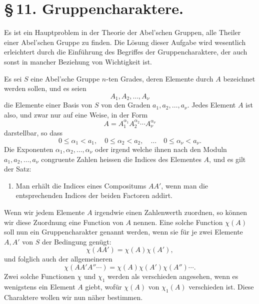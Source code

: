 \documentclass[11pt]{article}
\begin{document}
\section*{\S\,11. Gruppencharaktere.}

Es ist ein Hauptproblem in der Theorie der Abel'schen Gruppen, alle Theiler einer Abel'schen Gruppe zu finden. Die Lösung dieser Aufgabe wird wesentlich erleichtert durch die Einführung des Begriffes der Gruppencharaktere, der auch sonst in mancher Beziehung von Wichtigkeit ist.

Es sei $S$ eine Abel'sche Gruppe $n$-ten Grades, deren Elemente durch $A$ bezeichnet werden sollen, und es seien
\begin{equation}
A_1,A_2,\ldots,A_\nu
\tag{1}
\end{equation}
die Elemente einer Basis von $S$ von den Graden $a_1,a_2,\ldots,a_\nu$. Jedes Element $A$ ist also, und zwar nur auf eine Weise, in der Form
\begin{equation}
A=A_1^{\alpha_1}A_2^{\alpha_2}\cdots A_\nu^{\alpha_\nu}
\tag{2}
\end{equation}
darstellbar, so dass
\begin{equation}
0\le \alpha_1<a_1,
\quad 0\le \alpha_2<a_2,
\quad\ldots\quad
0\le \alpha_\nu<a_\nu.
\tag{3}
\end{equation}
Die Exponenten $\alpha_1,\alpha_2,
\ldots,\alpha_\nu$ oder irgend welche ihnen nach den Moduln $a_1,a_2,\ldots,a_\nu$ congruente Zahlen heissen die Indices des Elementes $A$, und es gilt der Satz:

\begin{enumerate}[label=\arabic*.]
\item Man erhält die Indices eines Compositums $AA'$, wenn man die entsprechenden Indices der beiden Factoren addirt.
\end{enumerate}

Wenn wir jedem Elemente $A$ irgendwie einen Zahlenwerth zuordnen, so können wir diese Zuordnung eine Function von $A$ nennen. Eine solche Function $\chi(A)$ soll nun ein Gruppencharakter genannt werden, wenn sie für je zwei Elemente $A,A'$ von $S$ der Bedingung genügt:
\begin{equation}
\chi(AA')=\chi(A)\chi(A'),
\tag{4}
\end{equation}
und folglich auch der allgemeineren
\[
\chi(AA'A''\cdots)=\chi(A)\chi(A')\chi(A'')\cdots.
\]
Zwei solche Functionen $\chi$ und $\chi_1$ werden als verschieden angesehen, wenn es wenigstens ein Element $A$ giebt, wofür $\chi(A)$ von $\chi_1(A)$ verschieden ist. Diese Charaktere wollen wir nun näher bestimmen.
\end{document}
